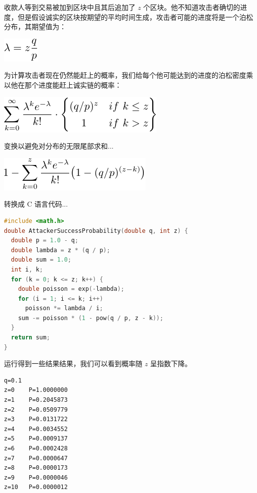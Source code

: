 \documentclass{article}
\begin{document}
收款人等到交易被加到区块中且其后追加了 $z$ 个区块。他不知道攻击者确切的进度，但是假设诚实的区块按期望的平均时间生成，攻击者可能的进度将是一个泊松分布，其期望值为：

\begin{center}
 \includegraphics{bitcoin-zh-cn-9}
\end{center}

为计算攻击者现在仍然能赶上的概率，我们给每个他可能达到的进度的泊松密度乘以他在那个进度能赶上诚实链的概率：

\begin{center}
 \includegraphics{bitcoin-zh-cn-10}
\end{center}

变换以避免对分布的无限尾部求和...

\begin{center}
 \includegraphics{bitcoin-zh-cn-11}
\end{center}

转换成 C 语言代码...

\begin{lstlisting}[language=C]
#include <math.h>
double AttackerSuccessProbability(double q, int z) {
  double p = 1.0 - q;
  double lambda = z * (q / p);
  double sum = 1.0;
  int i, k;
  for (k = 0; k <= z; k++) {
    double poisson = exp(-lambda);
    for (i = 1; i <= k; i++)
      poisson *= lambda / i;
    sum -= poisson * (1 - pow(q / p, z - k));
  }
  return sum;
}
\end{lstlisting}

运行得到一些结果结果，我们可以看到概率随 $z$ 呈指数下降。

\begin{lstlisting}
q=0.1
z=0    P=1.0000000
z=1    P=0.2045873
z=2    P=0.0509779
z=3    P=0.0131722
z=4    P=0.0034552
z=5    P=0.0009137
z=6    P=0.0002428
z=7    P=0.0000647
z=8    P=0.0000173
z=9    P=0.0000046
z=10   P=0.0000012
\end{lstlisting}
\end{document}
